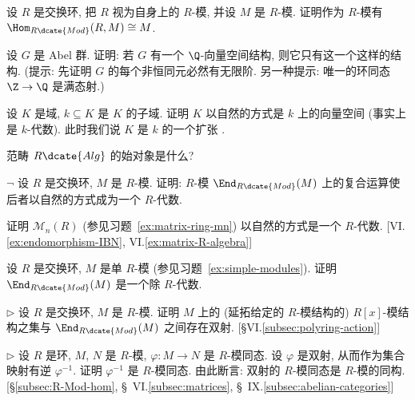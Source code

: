 \begin{prob}
\label{ex:hom-R-M}
设 $R$ 是交换环, 把 $R$ 视为自身上的 $R$-模, 并设 $M$ 是 $R$-模. 证明作为 $R$-模有 $\Hom_{R\dcate{Mod}}(R, M) \cong M$.
\end{prob}

\begin{prob}
\label{ex:Q-vector-space}
设 $G$ 是 Abel 群. 证明: 若 $G$ 有一个 $\Q$-向量空间结构, 则它只有这一个这样的结构. (提示: 先证明 $G$ 的每个非恒同元必然有无限阶. 另一种提示: 唯一的环同态 $\Z \to \Q$ 是满态射.)
\end{prob}

\begin{prob}
\label{ex:field-extension-module}
设 $K$ 是域, $k \subseteq K$ 是 $K$ 的子域. 证明 $K$ 以自然的方式是 $k$ 上的向量空间 (事实上是 $k$-代数). 此时我们说 $K$ 是 $k$ 的一个扩张%
.
\end{prob}

\begin{prob}
\label{ex:initial-R-Alg}
范畴 $R\dcate{Alg}$ 的始对象是什么?
\end{prob}

\begin{prob}
\label{ex:end-algebra}
$\neg$ 设 $R$ 是交换环, $M$ 是 $R$-模. 证明: $R$-模 $\End_{R\dcate{Mod}}(M)$ 上的复合运算使后者以自然的方式成为一个 $R$-代数.

证明 $\mathcal{M}_n(R)$ (参见习题~\ref{ex:matrix-ring-mn}) 以自然的方式是一个 $R$-代数. [VI.\ref{ex:endomorphism-IBN}, VI.\ref{ex:matrix-R-algebra}]
\end{prob}

\begin{prob}
\label{ex:simple-end}
设 $R$ 是交换环, $M$ 是单 $R$-模 (参见习题~\ref{ex:simple-modules}). 证明 $\End_{R\dcate{Mod}}(M)$ 是一个除 $R$-代数.
\end{prob}

\begin{prob}
\label{ex:Rx-module-structures}
$\triangleright$ 设 $R$ 是交换环, $M$ 是 $R$-模. 证明 $M$ 上的 (延拓给定的 $R$-模结构的) $R[x]$-模结构之集与 $\End_{R\dcate{Mod}}(M)$ 之间存在双射. [\S VI.\ref{subsec:polyring-action}]
\end{prob}

\begin{prob}
\label{ex:bijection-iso}
$\triangleright$ 设 $R$ 是环, $M$, $N$ 是 $R$-模, $\varphi : M \to N$ 是 $R$-模同态. 设 $\varphi$ 是双射, 从而作为集合映射有逆 $\varphi^{-1}$. 证明 $\varphi^{-1}$ 是 $R$-模同态. 由此断言: 双射的 $R$-模同态是 $R$-模的同构. [\S\ref{subsec:R-Mod-hom}, \S~VI.\ref{subsec:matrices}, \S~IX.\ref{subsec:abelian-categories}]
\end{prob}

